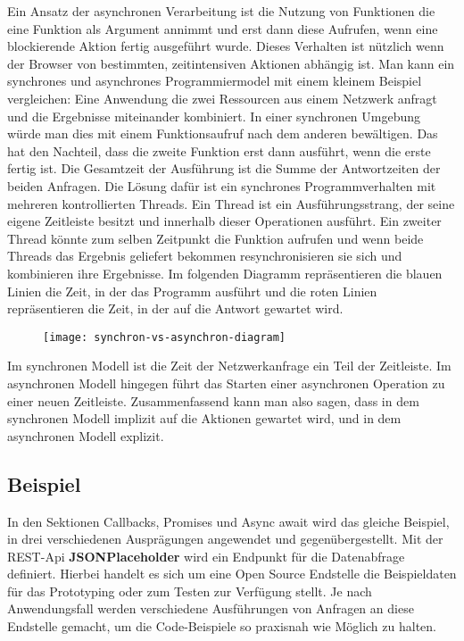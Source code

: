 Ein Ansatz der asynchronen Verarbeitung ist die Nutzung von Funktionen die eine Funktion als Argument annimmt und erst dann diese Aufrufen, wenn eine blockierende Aktion fertig ausgeführt wurde. Dieses Verhalten ist nützlich wenn der Browser von bestimmten, zeitintensiven Aktionen abhängig ist. Man kann ein synchrones und asynchrones Programmiermodel mit einem kleinem Beispiel vergleichen: Eine Anwendung die zwei Ressourcen aus einem Netzwerk anfragt und die Ergebnisse miteinander kombiniert. In einer synchronen Umgebung würde man dies mit einem Funktionsaufruf nach dem anderen bewältigen. Das hat den Nachteil, dass die zweite Funktion erst dann ausführt, wenn die erste fertig ist. Die Gesamtzeit der Ausführung ist die Summe der Antwortzeiten der beiden Anfragen. Die Lösung dafür ist ein synchrones Programmverhalten mit mehreren kontrollierten Threads. Ein Thread ist ein Ausführungsstrang, der seine eigene Zeitleiste besitzt und innerhalb dieser Operationen ausführt. Ein zweiter Thread könnte zum selben Zeitpunkt die Funktion aufrufen und wenn beide Threads das Ergebnis geliefert bekommen resynchronisieren sie sich und kombinieren ihre Ergebnisse. Im folgenden Diagramm repräsentieren die blauen Linien die Zeit, in der das Programm ausführt und die roten Linien repräsentieren die Zeit, in der auf die Antwort gewartet wird.\cite{asynchronitaet}

\begin{center}
\begin{figure}[H]
\texttt{[image: synchron-vs-asynchron-diagram]}
\end{figure}
\end{center}

\noindent
Im synchronen Modell ist die Zeit der Netzwerkanfrage ein Teil der Zeitleiste. Im asynchronen Modell hingegen führt das Starten einer asynchronen Operation zu einer neuen Zeitleiste. Zusammenfassend kann man also sagen, dass in dem synchronen Modell implizit auf die Aktionen gewartet wird, und in dem asynchronen Modell explizit.

\subsection{Beispiel}
In den Sektionen Callbacks, Promises und Async await wird das gleiche Beispiel, in drei verschiedenen Ausprägungen angewendet und gegenübergestellt. Mit der REST-Api \textbf{JSONPlaceholder} wird ein Endpunkt für die Datenabfrage definiert. Hierbei handelt es sich um eine Open Source Endstelle die Beispieldaten für das Prototyping oder zum Testen zur Verfügung stellt. Je nach Anwendungsfall werden verschiedene Ausführungen von Anfragen an diese Endstelle gemacht, um die Code-Beispiele so praxisnah wie Möglich zu halten.\\

